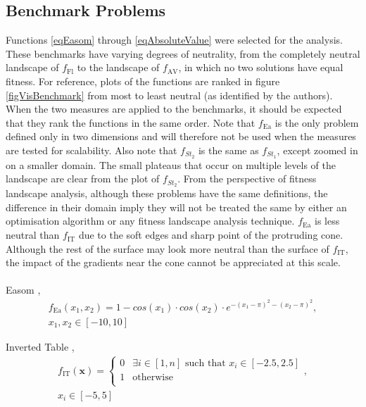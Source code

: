 \documentclass[conference]{IEEEtran}
\renewcommand{\vec}[1]{\mathbf{#1}}
\begin{document}
\subsection{Benchmark Problems}
\label{visualBenchmarks}
Functions \ref{eqEasom} through \ref{eqAbsoluteValue} were selected for the analysis. These benchmarks have varying degrees of neutrality, from the completely neutral landscape of $f_{\text{Fl}}$  to the landscape of $f_{\text{AV}}$, in which no two solutions have equal fitness. For reference, plots of the functions are ranked in figure \ref{figVisBenchmark} from most to least neutral (as identified by the authors). When the two measures are applied to the benchmarks, it should be expected that they rank the functions in the same order. Note that $f_{\text{Ea}}$ is the only problem defined only in two dimensions and will therefore not be used when the measures are tested for scalability. Also note that $f_{\textit{St}_2}$ is the same as $f_{\textit{St}_1}$, except zoomed in on a smaller domain. The small plateaus that occur on multiple levels of the landscape are clear from the plot of $f_{\textit{St}_2}$. From the perspective of fitness landscape analysis, although these problems have the same definitions, the difference in their domain imply they will not be treated the same by either an optimisation algorithm or any fitness landscape analysis technique. $f_{\text{Ea}}$ is less neutral than $f_{\text{IT}}$ due to the soft edges and sharp point of the protruding cone. Although the rest of the surface may look more neutral than the surface of $f_{\text{IT}}$, the impact of the gradients near the cone cannot be appreciated at this scale.
\\\\
Easom \cite{van2006study},
\begin{multline}
\label{eqEasom}
	f_{\text{Ea}}(x_1, x_2)= 1 - cos(x_1) \cdot cos(x_2) \cdot e^{-{(x_1 - \pi)}^2-{(x_2-\pi)}^2},\\
	x_1, x_2 \in [-10,10]		
\end{multline}

Inverted Table \cite{malan2009quantifying},
\begin{multline}
\label{eqInvertedTable}
	f_{\text{IT}}(\vec{x}) = \begin{cases} 
							0 & \exists i \in [1,n] \text{ such that } x_i \in [-2.5, 2.5] \\
							1 & \text{otherwise} \\							
						  \end{cases},\\
    x_i \in [-5,5] 
\end{multline}
\end{document}
